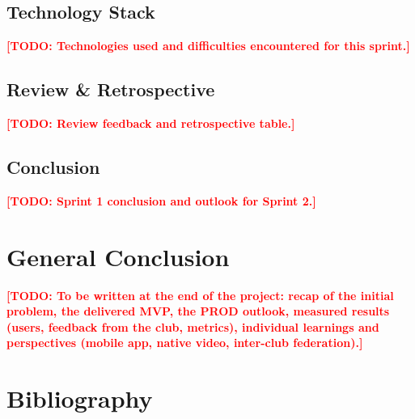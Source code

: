 \documentclass[12pt,a4paper]{report}
\newcommand{\todo}[1]{\textcolor{red}{\textbf{[TODO: #1]}}}
\begin{document}
\section{Technology Stack}
\todo{Technologies used and difficulties encountered for this sprint.}

\section{Review \& Retrospective}
\todo{Review feedback and retrospective table.}

\section{Conclusion}
\todo{Sprint 1 conclusion and outlook for Sprint 2.}


\clearpage

\chapter{General Conclusion}

\todo{To be written at the end of the project: recap of the initial problem, the
delivered MVP, the PROD outlook, measured results (users, feedback from the club,
metrics), individual learnings and perspectives (mobile app, native video, inter-club
federation).}

\clearpage

\chapter*{Bibliography}
\end{document}
